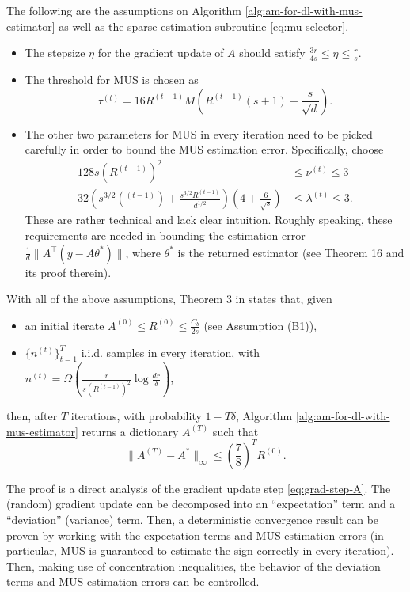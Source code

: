 The following are the assumptions on Algorithm \ref{alg:am-for-dl-with-mus-estimator} as well as the sparse estimation subroutine \ref{eq:mu-selector}.
\begin{itemize}
    \item The stepsize $\eta$ for the gradient update of $A$ should satisfy $\frac{3r}{4s}\leq \eta \leq \frac{r}{s}$.
    \item The threshold for MUS is chosen as \[\tau^{(t)} = 16 R^{(t-1)} M\left(R^{(t-1)} (s+1)  + \frac{s}{\sqrt{d}} \right).\]
    \item The other two parameters for MUS in every iteration need to be picked carefully in order to bound the MUS estimation error. Specifically, choose
    \begin{align*}
        128s \left(R^{(t-1)}\right)^2 & \leq \nu^{(t)} \leq 3 \\
        32 \left( s^{3/2} \left(^{(t-1)}\right) + \frac{s^{3/2}R^{(t-1)}}{d^{1/2}} \right)\left( 4 + \frac{6}{\sqrt{s}} \right) &\leq \lambda^{(t)} \leq 3. 
    \end{align*}
    These are rather technical and lack clear intuition. Roughly speaking, these requirements are needed in bounding the estimation error $\frac{1}{d}\|A^\top (y - A \theta^*)\|$, where $\theta^*$ is the returned estimator (see Theorem 16 and its proof therein).
    \end{itemize}
    
With all of the above assumptions, Theorem 3 in \cite{chatterji2017alternating} states that, given 
\begin{itemize}
    \item an initial iterate $A^{(0)}\leq R^{(0)} \leq \frac{C_b}{2s}$ (see Assumption (B1)), 
    \item $\{ n^{(t)}\}_{t=1}^T$ i.i.d. samples in every iteration, with $n^{(t)} = \Omega\left(\frac{r}{s(R^{(t-1)})^2} \log \frac{dr}{\delta} \right)$, 
\end{itemize}
then, after $T$ iterations, with probability $1 - T\delta$, Algorithm \ref{alg:am-for-dl-with-mus-estimator} returns a dictionary $A^{(T)}$ such that \[ \|A^{(T)} - A^*\|_\infty \leq \left(\frac{7}{8}\right)^T R^{(0)}. \]

The proof is a direct analysis of the gradient update step \eqref{eq:grad-step-A}. The (random) gradient update can be decomposed into
an ``expectation'' term and a ``deviation'' (variance) term.
Then, a deterministic convergence result can be proven by working with the expectation terms and MUS estimation errors (in particular, MUS is guaranteed to estimate the sign correctly in every iteration). Then, making use of concentration inequalities, the behavior of the deviation terms and MUS estimation errors can be controlled.

